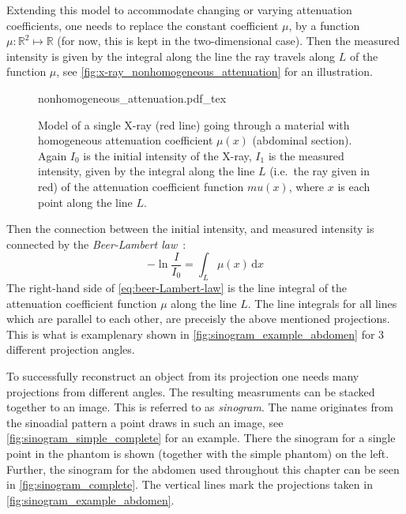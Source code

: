 Extending this model to accommodate changing or varying attenuation coefficients, one needs to
replace the constant coefficient \(\mu\), by a function \(\mu: \mathbb{R}^2 \mapsto \mathbb{R}\)
(for now, this is kept in the two-dimensional case). Then the measured intensity is given by the
integral along the line the ray travels along \(L\) of the function \(\mu\), see
\autoref{fig:x-ray_nonhomogeneous_attenuation} for an illustration.

\begin{figure}
	\centering
	\def\svgwidth{0.75\textwidth}
	{nonhomogeneous_attenuation.pdf_tex}
	\caption{Model of a single X-ray (red line) going through a material with
		homogeneous attenuation coefficient \(\mu(x)\) (abdominal section). Again \(I_0\) is
		the initial intensity of the X-ray, \(I_1\) is the measured intensity, given
		by the integral along the line \(L\) (i.e.\ the ray given in red) of the
		attenuation coefficient function \(mu(x)\), where \(x\) is each point along the
		line \(L\).}\label{fig:x-ray_nonhomogeneous_attenuation}
\end{figure}

Then the connection between the initial intensity, and measured intensity is connected by the
\textit{Beer-Lambert law}~\cite{buzug_computed_2008}:
\begin{equation}\label{eq:beer-Lambert-law}
	- \ln \frac{I}{I_0} = \int_L \mu (x) \, \mathrm{d}x
\end{equation}
The right-hand side of \autoref{eq:beer-Lambert-law} is the line integral of the attenuation
coefficient function \(\mu\) along the line \(L\). The line integrals for all lines which are
parallel to each other, are preceisly the above mentioned projections. This is what is examplenary
shown in \autoref{fig:sinogram_example_abdomen} for 3 different projection angles.

To successfully reconstruct an object from its projection one needs many projections from different
angles. The resulting measruments can be stacked together to an image. This is referred to as
\textit{sinogram}. The name originates from the sinoadial pattern a point draws in such an image,
see \autoref{fig:sinogram_simple_complete} for an example. There the sinogram for a single point in
the phantom is shown (together with the simple phantom) on the left. Further, the sinogram for the
abdomen used throughout this chapter can be seen in \autoref{fig:sinogram_complete}. The vertical
lines mark the projections taken in \autoref{fig:sinogram_example_abdomen}.

